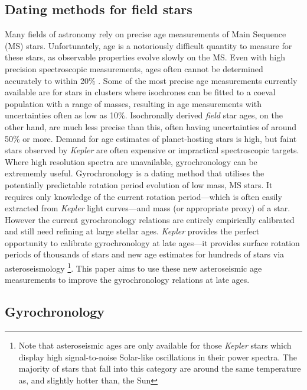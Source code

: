 \documentclass[useAMS, usenatbib]{mn2e}
\begin{document}
\subsection{Dating methods for field stars}

Many fields of astronomy rely on precise age measurements of Main Sequence
(MS) stars.
Unfortunately, age is a notoriously difficult quantity to measure for these
stars, as observable properties evolve slowly on the MS.
Even with high precision spectroscopic measurements, ages often cannot be
determined accurately to within 20\% \citep{Soderblom2010}.
Some of the most precise age measurements currently available are for stars in
clusters where isochrones can be fitted to a coeval population with a range of
masses, resulting in age measurements with uncertainties often as low as 10\%.
Isochronally derived {\it field} star ages, on the other hand, are much less
precise than this, often having uncertainties of around 50\% or more.
Demand for age estimates of planet-hosting stars is high, but faint stars
observed by {\it Kepler} are often expensive or impractical spectroscopic
targets.
Where high resolution spectra are unavailable, gyrochronology can be
extrememly useful.
Gyrochronology is a dating method that utilises the potentially
predictable rotation period evolution of low mass, MS stars.
It requires only knowledge of the current rotation period---which is often
easily extracted from {\it Kepler} light curves---and mass (or appropriate
proxy) of a star.
However the current gyrochronology relations are entirely empirically
calibrated and still need refining at large stellar ages.
{\it Kepler} provides the perfect opportunity to calibrate gyrochronology at
late ages---it provides surface rotation periods of thousands of stars and new
age estimates for hundreds of stars via asteroseismology \footnote{Note that
asteroseismic ages are only available for those {\it Kepler} stars which display
high signal-to-noise Solar-like oscillations in their power
spectra.
The majority of stars that fall into this category are around the same
temperature as, and slightly hotter than, the Sun}.  %
This paper aims to use these new asteroseismic age measurements to improve the
gyrochronology relations at late ages.

\subsection{Gyrochronology}
\end{document}
